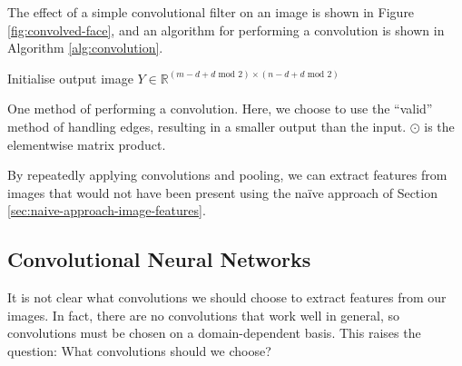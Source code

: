         The effect of a simple convolutional filter on an image is shown in
        Figure \ref{fig:convolved-face}, and an algorithm for performing a
        convolution is shown in Algorithm \ref{alg:convolution}.

        \begin{algorithm}[!ht]

            Initialise output image $Y \in \mathbb{R}^{(m - d + d \text{ mod } 2) \times (n - d + d \text{ mod } 2)}$\;

            \caption{One method of performing a convolution. Here, we choose to
                use the ``valid'' method of handling edges, resulting in a
                smaller output than the input. $\odot$ is the elementwise
                matrix product.}
            \label{alg:convolution}
        \end{algorithm}

        By repeatedly applying convolutions and pooling, we can extract features
        from images that would not have been present using the na\"ive approach
        of Section \ref{sec:naive-approach-image-features}.

    \subsection{Convolutional Neural Networks}
    \label{sec:convolutional-neural-networks}

        It is not clear what convolutions we should choose to extract features
        from our images. In fact, there are no convolutions that work well in
        general, so convolutions must be chosen on a domain-dependent basis.
        This raises the question: What convolutions should we choose?

